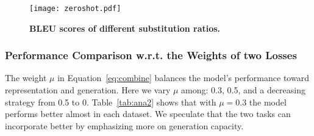 \begin{figure}[htbp]
    \centering
    \texttt{[image: zeroshot.pdf]}
    \caption{\textbf{BLEU scores of different substitution ratios.}}
    \label{fig:ana1}
\end{figure}


\subsubsection{Performance Comparison w.r.t. the Weights of two Losses} \label{sec:lambda}
The weight $\mu$ in Equation~\ref{eq:combine} balances the model's performance toward representation and generation. Here we vary $\mu$ among: 0.3, 0.5, and a decreasing strategy from 0.5 to 0.
Table~\ref{tab:ana2} shows that with $\mu=0.3$  the model performs better almost in each dataset. We speculate that the two tasks can incorporate better by emphasizing more on generation capacity.





\begin{table}[htbp]
\caption{\textbf{BLEU scores with different $\mu$.}}
\label{tab:ana2}
\centering
\small
{}
\end{table}


